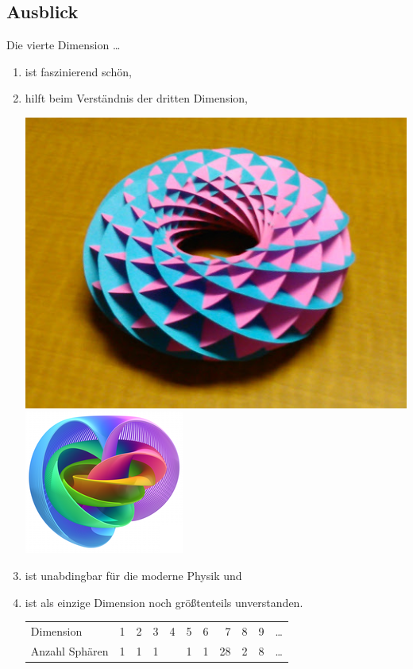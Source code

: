 \documentclass[12pt,compress,ngerman,utf8,t]{beamer}
\newcommand{\hil}[1]{{\usebeamercolor[fg]{item}{\textbf{#1}}}}
\begin{document}
\subsection{Ausblick}

\begin{frame}{Die vierte Dimension \ldots}
  \begin{enumerate}
    \item ist faszinierend schön,

    \item hilft beim Verständnis der dritten Dimension,

    \begin{center}
      \includegraphics[height=0.3\textheight]{torus-circles}
      \qquad\qquad
      \includegraphics[height=0.3\textheight]{hopf-fibration}
    \end{center}

    \item ist unabdingbar für die moderne Physik und

    \item ist als einzige Dimension noch größtenteils unverstanden.

    \begin{center}
      \begin{tabular}{l|rrrrrrrrrr}
        Dimension & 1 & 2 & 3 & 4 & 5 & 6 & 7 & 8 & 9 & \ldots \\
        Anzahl Sphären & 1 & 1 & 1 & \hil{??} & 1 & 1 & 28 & 2 & 8 & \ldots
      \end{tabular}
    \end{center}
  \end{enumerate}
\end{frame}
\end{document}

